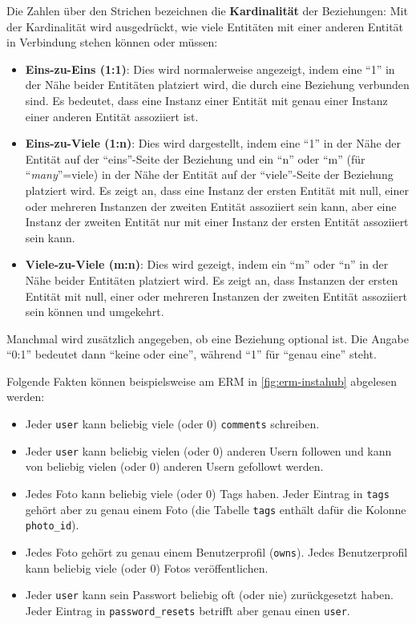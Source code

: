 Die Zahlen über den Strichen bezeichnen die \textbf{Kardinalität} der Beziehungen: Mit der Kardinalität wird ausgedrückt, wie viele Entitäten mit einer anderen Entität in Verbindung stehen können oder müssen:
\begin{itemize}
  \item \textbf{Eins-zu-Eins (1:1)}: Dies wird normalerweise angezeigt, indem eine \enquote{1} in der Nähe beider Entitäten platziert wird, die durch eine Beziehung verbunden sind. Es bedeutet, dass eine Instanz einer Entität mit genau einer Instanz einer anderen Entität assoziiert ist.
  \item \textbf{Eins-zu-Viele (1:n)}: Dies wird dargestellt, indem eine \enquote{1} in der Nähe der Entität auf der \enquote{eins}-Seite der Beziehung und ein \enquote{n} oder \enquote{m} (für \enquote{\textit{many}}=viele) in der Nähe der Entität auf der \enquote{viele}-Seite der Beziehung platziert wird. Es zeigt an, dass eine Instanz der ersten Entität mit null, einer oder mehreren Instanzen der zweiten Entität assoziiert sein kann, aber eine Instanz der zweiten Entität nur mit einer Instanz der ersten Entität assoziiert sein kann.
  \item \textbf{Viele-zu-Viele (m:n)}: Dies wird gezeigt, indem ein \enquote{m} oder \enquote{n} in der Nähe beider Entitäten platziert wird. Es zeigt an, dass Instanzen der ersten Entität mit null, einer oder mehreren Instanzen der zweiten Entität assoziiert sein können und umgekehrt.
\end{itemize}
Manchmal wird zusätzlich angegeben, ob eine Beziehung optional ist. Die Angabe \enquote{0:1} bedeutet dann \enquote{keine oder eine}, während \enquote{1} für \enquote{genau eine} steht.

Folgende Fakten können beispielsweise am \gls{ERM} in \cref{fig:erm-instahub} abgelesen werden:
\begin{itemize}
  \item Jeder \texttt{user} kann beliebig viele (oder 0) \texttt{comments} schreiben.
  \item Jeder \texttt{user} kann beliebig vielen (oder 0) anderen Usern followen und kann von beliebig vielen (oder 0) anderen Usern gefollowt werden.
  \item Jedes Foto kann beliebig viele (oder 0) Tags haben. Jeder Eintrag in \texttt{tags} gehört aber zu genau einem Foto (die Tabelle \texttt{tags} enthält dafür die Kolonne \texttt{photo\_id}).
  \item Jedes Foto gehört zu genau einem Benutzerprofil (\texttt{owns}). Jedes Benutzerprofil kann beliebig viele (oder 0) Fotos veröffentlichen.
  \item Jeder \texttt{user} kann sein Passwort beliebig oft (oder nie) zurückgesetzt haben. Jeder Eintrag in \texttt{password\_resets} betrifft aber genau einen \texttt{user}.
\end{itemize}


